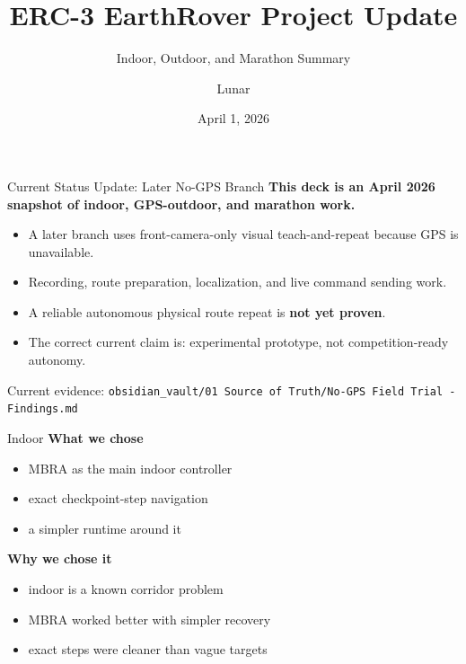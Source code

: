 \documentclass[aspectratio=169]{beamer}
\title{ERC-3 EarthRover Project Update}
\subtitle{Indoor, Outdoor, and Marathon Summary}
\author{Lunar}
\date{April 1, 2026}
\begin{document}
\begin{frame}
  \titlepage
\end{frame}

\begin{frame}{Current Status Update: Later No-GPS Branch}
\textbf{This deck is an April 2026 snapshot of indoor, GPS-outdoor, and marathon work.}

\vspace{0.5em}
\begin{itemize}
  \item A later branch uses front-camera-only visual teach-and-repeat because GPS is unavailable.
  \item Recording, route preparation, localization, and live command sending work.
  \item A reliable autonomous physical route repeat is \textbf{not yet proven}.
  \item The correct current claim is: experimental prototype, not competition-ready autonomy.
\end{itemize}

\vspace{0.5em}
\small Current evidence: \texttt{obsidian\_vault/01 Source of Truth/No-GPS Field Trial - Findings.md}
\end{frame}

\begin{frame}{Indoor}
\textbf{What we chose}
\begin{itemize}
  \item MBRA as the main indoor controller
  \item exact checkpoint-step navigation
  \item a simpler runtime around it
\end{itemize}

\vspace{0.5em}
\textbf{Why we chose it}
\begin{itemize}
  \item indoor is a known corridor problem
  \item MBRA worked better with simpler recovery
  \item exact steps were cleaner than vague targets
\end{itemize}
\end{frame}
\end{document}
